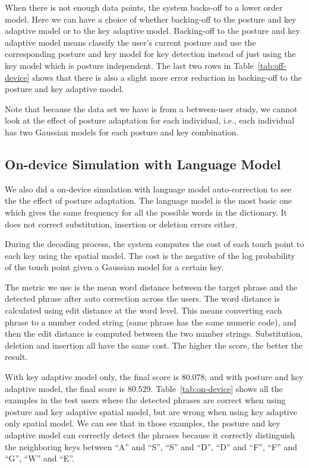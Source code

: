 \documentclass{sigchi}
\begin{document}
When there is not enough data points, the system backs-off to a lower order model.
Here we can have a choice of whether backing-off to the posture and key adaptive model or 
to the key adaptive model. Backing-off to the posture and key adaptive model means
classify the user's current posture and use the corresponding posture and key model for key detection instead
of just using the key model which is posture independent. The last two rows in 
Table~\ref{tab:off-device} shows that there is also a slight more error reduction  in backing-off to
the posture and key adaptive model.

Note that because the data set we have is from a between-user study, we cannot look
at the effect of posture adaptation for each individual, i.e., each individual has two Gaussian models
for each posture and key combination.

\subsection{On-device Simulation with Language Model}
We also did a on-device simulation with language model auto-correction to see the
the effect of posture adaptation. The language model is the most basic one which
gives the same frequency for all the possible words in the dictionary. It does not
correct substitution, insertion or deletion errors either.

During the decoding process, the system computes the cost of each touch point to
each key using the spatial model. The cost is the negative of the log probability of
the touch point given a Gaussian model for a certain key.

The metric we use is the mean word distance between the target phrase and the detected
phrase after auto correction across the users. The word distance is calculated using 
edit distance at the word level. This means converting each phrase to a number coded
string (same phrase has the same numeric code), and then the edit distance is computed
between the two number strings. Substitution, deletion and insertion all have the same
cost. The higher the score, the better the result.

With key adaptive model only, the final score is 80.078; and with posture and key
adaptive model, the final score is 80.529. Table~\ref{tab:on-device} shows all the examples
in the test users where the detected phrases are correct when using posture and key adaptive spatial model, but
are wrong when using key adaptive only spatial model. We can see that in those examples,
the posture and key adaptive model can correctly detect the phrases because it
correctly distinguish the neighboring keys between ``A'' and ``S'', ``S'' and ``D'',
``D'' and ``F'', ``F'' and ``G'', ``W'' and ``E''. 
\end{document}
